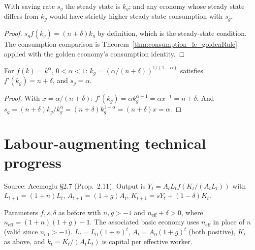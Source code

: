 \begin{theorem}
\label{thm:goldenRule_attainable}
\leanok
{}
With saving rate $s_g$ the steady state is $k_g$; and any economy whose steady state differs from $k_g$ would
have strictly higher steady-state consumption with $s_g$.
\end{theorem}
\begin{proof}
\leanok
$s_g f(k_g) = (n + \delta) k_g$ by definition, which is the steady-state condition. The consumption comparison
is Theorem~\ref{thm:consumption_le_goldenRule} applied with the golden economy's consumption identity.
\end{proof}

\begin{theorem}
\label{thm:cobbDouglas_goldenRule}
\leanok
{}
For $f(k) = k^\alpha$, $0 < \alpha < 1$: $k_g = (\alpha/(n+\delta))^{1/(1-\alpha)}$ satisfies $f'(k_g) = n + \delta$,
and $s_g = \alpha$.
\end{theorem}
\begin{proof}
\leanok
With $x = \alpha/(n + \delta)$: $f'(k_g) = \alpha k_g^{\alpha - 1} = \alpha x^{-1} = n + \delta$. And
$s_g = (n + \delta) k_g / k_g^\alpha = (n + \delta) k_g^{1 - \alpha} = (n + \delta) x = \alpha$.
\end{proof}

\section{Labour-augmenting technical progress}
\label{sec:tech_progress}

Source: Acemoglu \S2.7 (Prop.~2.11). Output is $Y_t = A_t L_t f(K_t/(A_t L_t))$ with
$L_{t+1} = (1 + n) L_t$, $A_{t+1} = (1 + g) A_t$, $K_{t+1} = s Y_t + (1 - \delta) K_t$.

\begin{definition}
\label{def:techEconomy}
\leanok
{}
Parameters $f, s, \delta$ as before with $n, g > -1$ and $n_{\mathrm{eff}} + \delta > 0$, where
$n_{\mathrm{eff}} = (1 + n)(1 + g) - 1$. The associated basic economy uses $n_{\mathrm{eff}}$ in place of $n$
(valid since $n_{\mathrm{eff}} > -1$). $L_t = L_0(1+n)^t$, $A_t = A_0(1+g)^t$ (both positive), $K_t$ as above,
and $k_t = K_t/(A_t L_t)$ is capital per effective worker.
\end{definition}

